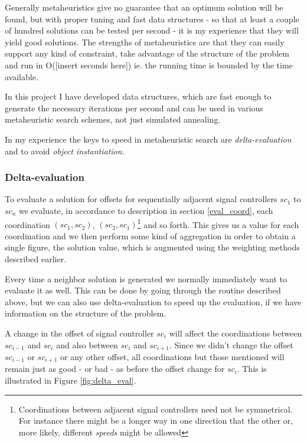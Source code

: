 Generally metaheuristics give no guarantee that an optimum solution will be found, but with proper tuning and fast data structures - so that at least a couple of hundred solutions can be tested per second - it is my experience that they will yield good solutions. The strengths of metaheuristics are that they can easily support any kind of constraint, take advantage of the structure of the problem and run in O([insert seconds here]) ie. the running time is bounded by the time available.

In this project I have developed data structures, which are fast enough to generate the necessary iterations per second and can be used in various metaheuristic search schemes, not just simulated annealing.

In my experience the keys to speed in metaheuristic search are \textit{delta-evaluation} and to avoid \textit{object instantiation}.

\subsubsection{Delta-evaluation}
To evaluate a solution for offsets for sequentially adjacent signal controllers $sc_1$ to $sc_n$ we evaluate, in accordance to description in section \ref{eval_coord}, each coordination $(sc_1,sc_2)$, $(sc_2,sc_1)$\footnote{Coordinations between adjacent signal controllers need not be symmetrical. For instance there might be a longer way in one direction that the other or, more likely, different \textit{speeds} might be allowed} and so forth. This gives us a value for each coordination and we then perform some kind of aggregation in order to obtain a single figure, the solution value, which is augmented using the weighting methods described earlier.

Every time a neighbor solution is generated we normally immediately want to evaluate it as well. This can be done by going through the routine described above, but we can also use delta-evaluation to speed up the evaluation, if we have information on the structure of the problem.

A change in the offset of signal controller $sc_i$ will affect the coordinations between $sc_{i-1}$ and $sc_{i}$ and also between $sc_{i}$ and $sc_{i+1}$. Since we didn't change the offset $sc_{i-1}$ or $sc_{i+1}$ or any other offset, all coordinations but those mentioned will remain just as good - or bad - as before the offset change for $sc_i$. This is illustrated in Figure \ref{fig:delta_eval}.


